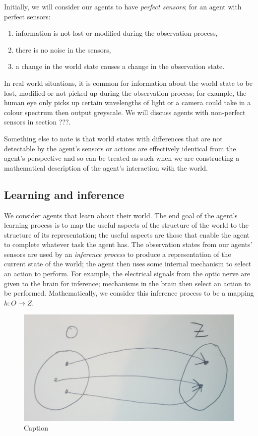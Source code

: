Initially, we will consider our agents to have \emph{perfect sensors}; for an agent with perfect sensors:
\begin{enumerate}
    \item information is not lost or modified during the observation process,
    \item there is no noise in the sensors, 
    \item a change in the world state causes a change in the observation state.
\end{enumerate}

In real world situations, it is common for information about the world state to be lost, modified or not picked up during the observation process; for example, the human eye only picks up certain wavelengths of light or a camera could take in a colour spectrum then output greyscale.
We will discuss agents with non-perfect sensors in section ???.

Something else to note is that world states with differences that are not detectable by the agent's sensors or actions are effectively identical from the agent's perspective and so can be treated as such when we are constructing a mathematical description of the agent's interaction with the world.

\subsection{Learning and inference}

We consider agents that learn about their world.
The end goal of the agent’s learning process is to map the useful aspects of the structure of the world to the structure of its representation; the useful aspects are those that enable the agent to complete whatever task the agent has.
The observation states from our agents' sensors are used by an \emph{inference process} to produce a representation of the current state of the world; the agent
then uses some internal mechanism to select an action to perform.
For example, the electrical signals from the optic nerve are given to the brain for inference; mechanisms in the brain then select an action to be performed. 
Mathematically, we consider this inference process to be a mapping $h: O \to Z$.
\begin{figure}
    \centering
    \includegraphics[width=0.5\linewidth]{2MathematicalFramework/InitialFramework/Images/inference_process_O_to_Z.jpeg}
    \caption{Caption}
    \label{fig:inference_process_O_to_Z}
\end{figure}

